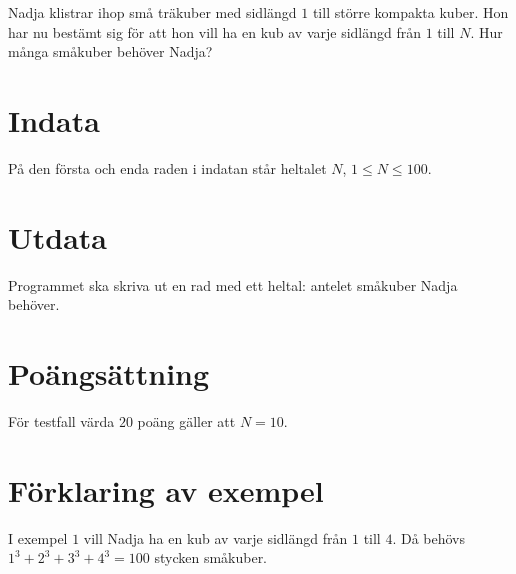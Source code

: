 %
Nadja klistrar ihop små träkuber med sidlängd $1$ till större kompakta kuber. Hon har nu bestämt sig för att hon vill ha en kub av varje sidlängd från $1$ till $N$. Hur många småkuber behöver Nadja?

\section*{Indata}
På den första och enda raden i indatan står heltalet $N$, $1 \leq N \leq 100$.

\section*{Utdata}
Programmet ska skriva ut en rad med ett heltal: antelet småkuber Nadja behöver.

\section*{Poängsättning}
För testfall värda $20$ poäng gäller att $N=10$.

\section*{Förklaring av exempel}
I exempel $1$ vill Nadja ha en kub av varje sidlängd från $1$ till $4$.
Då behövs $1^3 + 2^3 + 3^3 + 4^3 = 100$ stycken småkuber.
